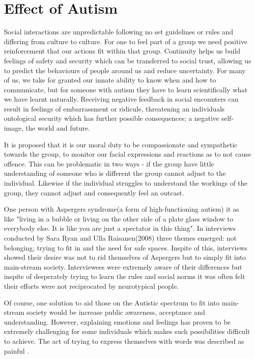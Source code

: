 \documentclass[11pt]{report}
\begin{document}
\section{Effect of Autism}

Social interactions are unpredictable following no set guidelines or rules and differing from culture to culture. For one to feel part of a group we need positive reinforcement that our actions fit within that group. Continuity helps us build feelings of safety and security which can be transferred to social trust, allowing us to predict the behaviours of people around us and reduce uncertainty. For many of us, we take for granted our innate ability to know when and how to communicate, but for someone with autism they have to learn scientifically what we have learnt naturally. Receiving negative feedback in social encounters can result in feelings of embarrassment or ridicule, threatening an individuals ontological security which has further possible consequences; a negative self-image, the world and future.

It is proposed that it is our moral duty to be compassionate and sympathetic towards the group, to monitor our facial expressions and reactions as to not cause offence. This can be problematic in two ways - if the group have little understanding of someone who is different the group cannot adjust to the individual. Likewise if the individual struggles to understand the workings of the group, they cannot adjust and consequently feel an outcast. 

One person with Aspergers syndrome(a form of high-functioning autism) it as like "living in a bubble or living on the other side of a plate glass window to everybody else. It is like you are just a spectator in this thing"\cite{aspieway}. In interviews conducted by Sara Ryan and Ulla Raisanen(2008) three themes emerged: not belonging, trying to fit in and the need for safe spaces. Inspite of this, interviews showed their desire was not to rid themselves of Aspergers but to simply fit into main-stream society. Interviewees were extremely aware of their differences but inspite of desperately trying to learn the rules and social norms it was often felt their efforts were not reciprocated by neurotypical people.

Of course, one solution to aid those on the Autistic spectrum to fit into main-stream society would be increase public awareness, acceptance and understanding. However, explaining emotions and feelings has proven to be extremely challenging for some individuals which makes such possibilities difficult to achieve. The act of trying to express themselves with words was described as painful \cite{aspieway}. 
\end{document}
